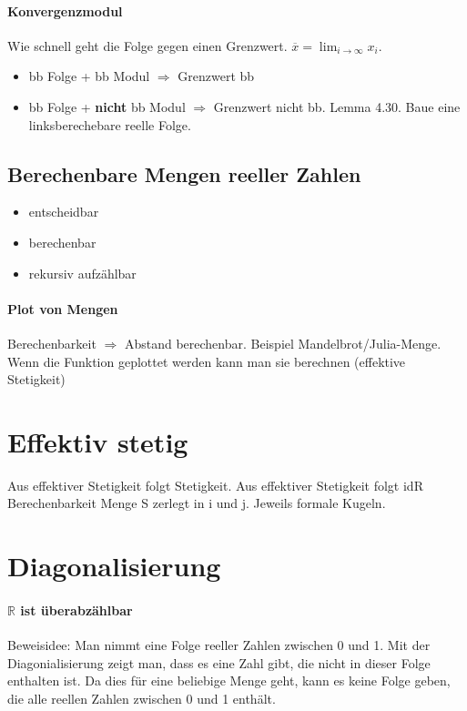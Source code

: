 \documentclass[ngerman]{scrartcl}
\begin{document}
\paragraph{Konvergenzmodul}
Wie schnell geht die Folge gegen einen Grenzwert. $ \overline{x} = \lim_{i \rightarrow \infty} x_ i $. 
\begin{itemize}
  \item bb Folge + bb Modul $ \Rightarrow $ Grenzwert bb
  \item bb Folge + \textbf{nicht} bb Modul $ \Rightarrow $ Grenzwert nicht bb. Lemma 4.30. Baue eine linksberechebare reelle Folge. 
\end{itemize}


\subsection{Berechenbare Mengen reeller Zahlen}
\begin{itemize}
  \item entscheidbar
  \item berechenbar
  \item rekursiv aufzählbar
\end{itemize}

\paragraph{Plot von Mengen} Berechenbarkeit $ \Rightarrow $ Abstand berechenbar. Beispiel Mandelbrot/Julia-Menge. Wenn die Funktion geplottet werden kann man sie berechnen (effektive Stetigkeit)

\section{Effektiv stetig}
Aus effektiver Stetigkeit folgt Stetigkeit. 
Aus effektiver Stetigkeit folgt idR Berechenbarkeit
Menge S zerlegt in i und j. Jeweils formale Kugeln. 

\section{Diagonalisierung}
\paragraph{$ \mathbb{R} $ ist überabzählbar}

Beweisidee: Man nimmt eine Folge reeller Zahlen zwischen 0 und 1. Mit der Diagonialisierung zeigt man, dass es eine Zahl gibt, die nicht in dieser Folge enthalten ist. Da dies für eine beliebige Menge geht, kann es keine Folge geben, die alle reellen Zahlen zwischen 0 und 1 enthält.
\end{document}
